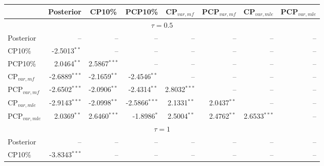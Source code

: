 { \renewcommand{\arraystretch}{1.2} 
{\footnotesize 
\begin{table} 
\center 
\begin{tabular}{l | rrrrrrr} 
& \multicolumn{1}{c}{Posterior}& \multicolumn{1}{c}{CP10\%}& \multicolumn{1}{c}{PCP10\%}& \multicolumn{1}{c}{CP$_{var,mf}$}& \multicolumn{1}{c}{PCP$_{var,mf}$}& \multicolumn{1}{c}{CP$_{var,mle}$}& \multicolumn{1}{c}{PCP$_{var,mle}$} \\ \hline 
\multicolumn{8}{c}{$\tau = 0.5$} \\ \hline 
Posterior &    --\phantom{$^{***}$} &    --\phantom{$^{***}$} &    --\phantom{$^{***}$} &    --\phantom{$^{***}$} &    --\phantom{$^{***}$} &    --\phantom{$^{***}$} &    --\phantom{$^{***}$}   \\ 
CP10\% & -2.5013$^{**}$\phantom{$^{*}$} &    --\phantom{$^{***}$} &    --\phantom{$^{***}$} &    --\phantom{$^{***}$} &    --\phantom{$^{***}$} &    --\phantom{$^{***}$} &    --\phantom{$^{***}$}   \\ 
PCP10\% & 2.0464$^{**}$\phantom{$^{*}$} & 2.5867$^{***}$ &    --\phantom{$^{***}$} &    --\phantom{$^{***}$} &    --\phantom{$^{***}$} &    --\phantom{$^{***}$} &    --\phantom{$^{***}$}   \\ 
CP$_{var,mf}$ & -2.6889$^{***}$ & -2.1659$^{**}$\phantom{$^{*}$} & -2.4546$^{**}$\phantom{$^{*}$} &    --\phantom{$^{***}$} &    --\phantom{$^{***}$} &    --\phantom{$^{***}$} &    --\phantom{$^{***}$}   \\ 
PCP$_{var,mf}$ & -2.6502$^{***}$ & -2.0906$^{**}$\phantom{$^{*}$} & -2.4314$^{**}$\phantom{$^{*}$} & 2.8032$^{***}$ &    --\phantom{$^{***}$} &    --\phantom{$^{***}$} &    --\phantom{$^{***}$}   \\ 
CP$_{var,mle}$ & -2.9143$^{***}$ & -2.0998$^{**}$\phantom{$^{*}$} & -2.5866$^{***}$ & 2.1331$^{**}$\phantom{$^{*}$} & 2.0437$^{**}$\phantom{$^{*}$} &    --\phantom{$^{***}$} &    --\phantom{$^{***}$}   \\ 
PCP$_{var,mle}$ & 2.0369$^{**}$\phantom{$^{*}$} & 2.6460$^{***}$ & -1.8986$^{*}$\phantom{$^{**}$} & 2.5004$^{**}$\phantom{$^{*}$} & 2.4762$^{**}$\phantom{$^{*}$} & 2.6533$^{***}$ &    --\phantom{$^{***}$}   \\ 
\hline 
%
%
\multicolumn{8}{c}{$\tau = 1$} \\ \hline 
Posterior &    --\phantom{$^{***}$} &    --\phantom{$^{***}$} &    --\phantom{$^{***}$} &    --\phantom{$^{***}$} &    --\phantom{$^{***}$} &    --\phantom{$^{***}$} &    --\phantom{$^{***}$}   \\ 
CP10\% & -3.8343$^{***}$ &    --\phantom{$^{***}$} &    --\phantom{$^{***}$} &    --\phantom{$^{***}$} &    --\phantom{$^{***}$} &    --\phantom{$^{***}$} &    --\phantom{$^{***}$}   \\ 

\end{tabular}
\end{table}}}
